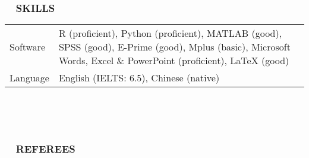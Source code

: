 \documentclass[a4paper, 12pt]{article}
\begin{document}
\  \par


\subsubsection*{ \ \ SKILLS}

\begin{tabularx}{\textwidth}{p{2cm} X}
    
    Software & R (proficient), Python (proficient), MATLAB (good), SPSS (good), E-Prime (good), Mplus (basic), Microsoft Words, Excel \& PowerPoint (proficient), LaTeX (good) \\
    
    Language & English (IELTS: 6.5), Chinese (native) \\
    
    \end{tabularx}

\  \par
\  \par



\subsubsection*{ \ \ REFEREES}



\end{document}
